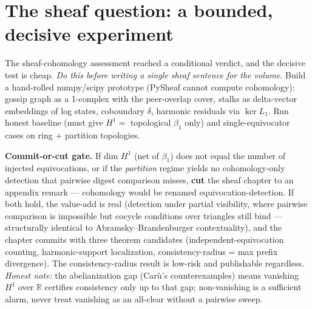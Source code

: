\documentclass[11pt,a4paper]{article}
\begin{document}
\section{The sheaf question: a bounded, decisive experiment}
The sheaf-cohomology assessment reached a conditional verdict, and the decisive test is cheap. \emph{Do this before writing a single sheaf sentence for the volume.} Build a hand-rolled numpy/scipy prototype (PySheaf cannot compute cohomology): gossip graph as a 1-complex with the peer-overlap cover, stalks as delta-vector embeddings of log states, coboundary $\delta$, harmonic residuals via $\ker L_1$. Run honest baseline (must give $H^1 = $ topological $\beta_1$ only) and single-equivocator cases on ring + partition topologies.
\begin{verdict}\textbf{Commit-or-cut gate.} If dim $H^1$ (net of $\beta_1$) does not equal the number of injected equivocations, or if the \emph{partition} regime yields no cohomology-only detection that pairwise digest comparison misses, \textbf{cut} the sheaf chapter to an appendix remark --- cohomology would be renamed equivocation-detection. If both hold, the value-add is real (detection under partial visibility, where pairwise comparison is impossible but cocycle conditions over triangles still bind --- structurally identical to Abramsky--Brandenburger contextuality), and the chapter commits with three theorem candidates (independent-equivocation counting, harmonic-support localization, consistency-radius = max prefix divergence). The consistency-radius result is low-risk and publishable regardless. \emph{Honest note:} the abelianization gap (Car\`u's counterexamples) means vanishing $H^1$ over $\mathbb{R}$ certifies consistency only up to that gap; non-vanishing is a sufficient alarm, never treat vanishing as an all-clear without a pairwise sweep.\end{verdict}
\end{document}
